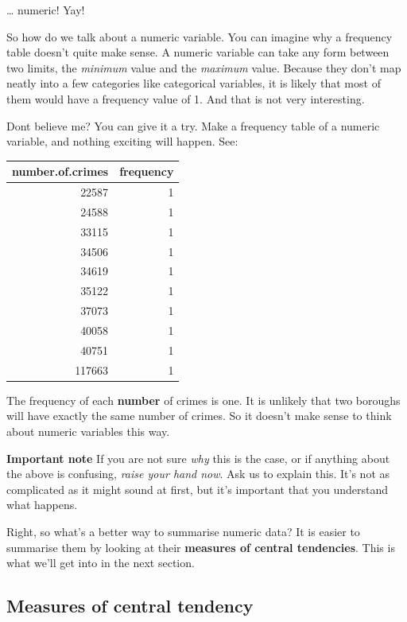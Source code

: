 \documentclass[]{book}
\theoremstyle{definition}
\theoremstyle{definition}
\theoremstyle{definition}
\theoremstyle{remark}
\begin{document}
\ldots{} numeric! Yay!

So how do we talk about a numeric variable. You can imagine why a
frequency table doesn't quite make sense. A numeric variable can take
any form between two limits, the \emph{minimum} value and the
\emph{maximum} value. Because they don't map neatly into a few
categories like categorical variables, it is likely that most of them
would have a frequency value of 1. And that is not very interesting.

Dont believe me? You can give it a try. Make a frequency table of a
numeric variable, and nothing exciting will happen. See:

\begin{tabular}{r|r}
\hline
number.of.crimes & frequency\\
\hline
22587 & 1\\
\hline
24588 & 1\\
\hline
33115 & 1\\
\hline
34506 & 1\\
\hline
34619 & 1\\
\hline
35122 & 1\\
\hline
37073 & 1\\
\hline
40058 & 1\\
\hline
40751 & 1\\
\hline
117663 & 1\\
\hline
\end{tabular}

The frequency of each \textbf{number} of crimes is one. It is unlikely
that two boroughs will have exactly the same number of crimes. So it
doesn't make sense to think about numeric variables this way.

\textbf{Important note} If you are not sure \emph{why} this is the case,
or if anything about the above is confusing, \emph{raise your hand now}.
Ask us to explain this. It's not as complicated as it might sound at
first, but it's important that you understand what happens.

Right, so what's a better way to summarise numeric data? It is easier to
summarise them by looking at their \textbf{measures of central
tendencies}. This is what we'll get into in the next section.

\hypertarget{measures-of-central-tendency}{%
\subsection{Measures of central
tendency}\label{measures-of-central-tendency}}
\end{document}
